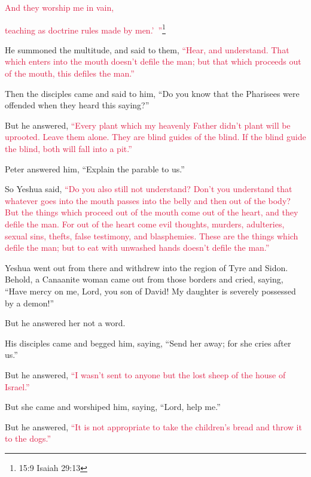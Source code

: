 \myverse{}\textcolor{crimson}{And they worship me in vain,}

\textcolor{crimson}{teaching as doctrine rules made by men.’ ”}\footnote{15:9 Isaiah 29:13
}

\myverse{}He summoned the multitude, and said to them,
\textcolor{crimson}{“Hear, and understand.
}
\myverse{}\textcolor{crimson}{That which enters into the mouth doesn’t defile the man; but that which
	proceeds out of the mouth, this defiles the man.”}

\myverse{}Then the disciples came and said to him, “Do you know that the
Pharisees were offended when they heard this saying?”

\myverse{}But he answered,
\textcolor{crimson}{“Every plant which my heavenly Father didn’t plant will be uprooted.
}
\myverse{}\textcolor{crimson}{Leave them alone. They are blind guides of the blind. If the blind guide
	the blind, both will fall into a pit.”}

\myverse{}Peter answered him, “Explain the parable to us.”

\myverse{}So Yeshua said,
\textcolor{crimson}{“Do you also still not understand?
}
\myverse{}\textcolor{crimson}{Don’t you understand that whatever goes into the mouth passes into the
	belly and then out of the body?
}
\myverse{}\textcolor{crimson}{But the things which proceed out of the mouth come out of the heart,
	and they defile the man.
}
\myverse{}\textcolor{crimson}{For out of the heart come evil thoughts, murders, adulteries, sexual
	sins, thefts, false testimony, and blasphemies.
}
\myverse{}\textcolor{crimson}{These are the things which defile the man; but to eat with unwashed hands
	doesn’t defile the man.”}

\myverse{}Yeshua went out from there and withdrew into the region of Tyre
and Sidon.
\myverse{}Behold, a Canaanite woman came out from those borders and cried, saying,
“Have mercy on me, Lord, you son of David! My daughter is severely possessed by a demon!”

\myverse{}But he answered her not a word.

His disciples came and begged him, saying, “Send her away; for she cries after us.”

\myverse{}But he answered,
\textcolor{crimson}{“I wasn’t sent to anyone but the lost sheep of the house of Israel.”}

\myverse{}But she came and worshiped him, saying, “Lord, help me.”

\myverse{}But he answered,
\textcolor{crimson}{“It is not appropriate to take the children’s bread and throw it to the dogs.”}

